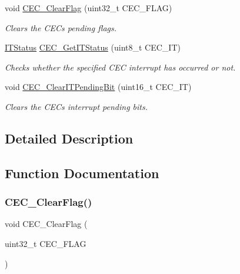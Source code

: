 \begin{DoxyCompactItemize}
void \hyperlink{group___c_e_c___exported___functions_ga928b373fb5972204c56f9c64113f8c67}{C\+E\+C\+\_\+\+Clear\+Flag} (uint32\+\_\+t C\+E\+C\+\_\+\+F\+L\+AG)
\begin{DoxyCompactList}\small\item\em Clears the C\+EC\textquotesingle{}s pending flags. \end{DoxyCompactList}\item 
\hyperlink{group___exported__types_gaacbd7ed539db0aacd973a0f6eca34074}{I\+T\+Status} \hyperlink{group___c_e_c___exported___functions_gaa1940a388d0bfcefe7483fb74cc2ba1d}{C\+E\+C\+\_\+\+Get\+I\+T\+Status} (uint8\+\_\+t C\+E\+C\+\_\+\+IT)
\begin{DoxyCompactList}\small\item\em Checks whether the specified C\+EC interrupt has occurred or not. \end{DoxyCompactList}\item 
void \hyperlink{group___c_e_c___exported___functions_gade646921262a077172c708953822f248}{C\+E\+C\+\_\+\+Clear\+I\+T\+Pending\+Bit} (uint16\+\_\+t C\+E\+C\+\_\+\+IT)
\begin{DoxyCompactList}\small\item\em Clears the C\+EC\textquotesingle{}s interrupt pending bits. \end{DoxyCompactList}\end{DoxyCompactItemize}


\subsection{Detailed Description}


\subsection{Function Documentation}
\mbox{\label{group___c_e_c___exported___functions_ga928b373fb5972204c56f9c64113f8c67}} 
\subsubsection{\texorpdfstring{C\+E\+C\+\_\+\+Clear\+Flag()}{CEC\_ClearFlag()}}
{\footnotesize\ttfamily void C\+E\+C\+\_\+\+Clear\+Flag (\begin{DoxyParamCaption}\item[{uint32\+\_\+t}]{C\+E\+C\+\_\+\+F\+L\+AG }\end{DoxyParamCaption})}



